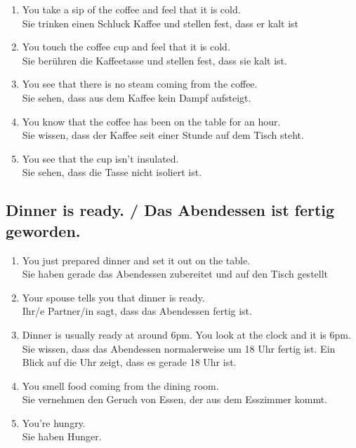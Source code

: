 \documentclass[11pt]{article}
\begin{document}
\begin{enumerate} 
	\item You take a sip of the coffee and feel that it is cold. \\
	Sie trinken einen Schluck Kaffee und stellen fest, dass er kalt ist
	\item You touch the coffee cup and feel that it is cold.\\
	Sie berühren die Kaffeetasse und stellen fest, dass sie kalt ist.
	\item You see that there is no steam coming from the coffee.\\
	Sie sehen, dass aus dem Kaffee kein Dampf aufsteigt.
	\item You know that the coffee has been on the table for an hour.\\
	Sie wissen, dass der Kaffee seit einer Stunde auf dem Tisch steht.
	\item You see that the cup isn't insulated.\\
	Sie sehen, dass die Tasse nicht isoliert ist.
\end{enumerate}

\subsection{Dinner is ready. / Das Abendessen ist fertig geworden.}

\begin{enumerate}
	\item You just prepared dinner and set it out on the table.\\
	Sie haben gerade das Abendessen zubereitet und auf den Tisch gestellt
	\item Your spouse tells you that dinner is ready.\\
	Ihr/e Partner/in sagt, dass das Abendessen fertig ist.
	\item Dinner is usually ready at around 6pm. You look at the clock and it is 6pm.\\
	Sie wissen, dass das Abendessen normalerweise um 18 Uhr fertig ist. Ein Blick auf die Uhr zeigt, dass es gerade 18 Uhr ist.
	\item You smell food coming from the dining room.\\
	Sie vernehmen den Geruch von Essen, der aus dem Esszimmer kommt.
	\item You're hungry.\\
	Sie haben Hunger.
\end{enumerate}
\end{document}
